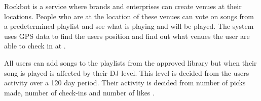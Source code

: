 Rockbot is a service where brands and enterprises can create venues at their locations. People who are at the location of these venues can vote on songs from a predetermined playlist and see what is playing and will be played. The system uses GPS data to find the users position and find out what venues the user are able to check in at \cite{rockbotFeatures}.

All users can add songs to the playlists from the approved library but when their song is played is affected by their DJ level. This level is decided from the users activity over a 120 day period. Their activity is decided from number of picks made, number of check-ins and number of likes \cite{rockbotBlog}.
